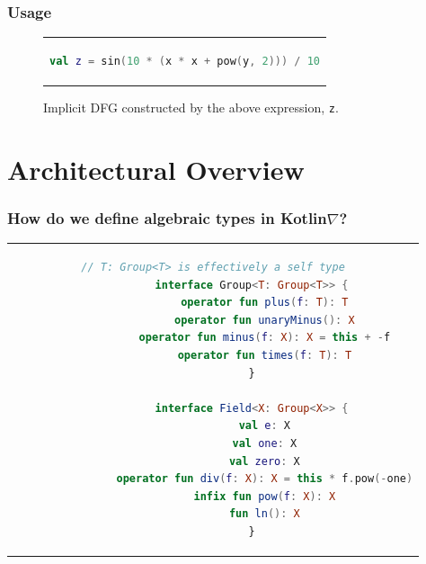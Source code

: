 \documentclass{beamer}
\begin{document}
    \begin{frame}[fragile]
        \frametitle{Usage}
            \squeezeup\begin{figure}[!htb]
                  \begin{center}
                  \begin{tabular}{c}
                  \begin{lstlisting}[language=Kotlin, gobble=22]
                      val z = sin(10 * (x * x + pow(y, 2))) / 10
                  \end{lstlisting}
                  \end{tabular}
                  \end{center}
                  \vspace{10}
                  \squeezeup\centering
                  \squeezeup\squeezeup\squeezeup\caption{Implicit DFG constructed by the above expression, \texttt{z}.}
    \end{figure}
    \end{frame}

    \section{Architectural Overview}


    \begin{frame}[fragile]
        \frametitle{How do we define algebraic types in Kotlin\texorpdfstring{$\nabla$}{}?}
\begin{center}
\begin{tabular}{c}
        \begin{lstlisting}[language=Kotlin, gobble=12]
            // T: Group<T> is effectively a self type
            interface Group<T: Group<T>> {
                operator fun plus(f: T): T
                operator fun unaryMinus(): X
                operator fun minus(f: X): X = this + -f
                operator fun times(f: T): T
            }

            interface Field<X: Group<X>> {
                val e: X
                val one: X
                val zero: X
                operator fun div(f: X): X = this * f.pow(-one)
                infix fun pow(f: X): X
                fun ln(): X
            }
        \end{lstlisting}
\end{tabular}
\end{center}
    \end{frame}
\end{document}
